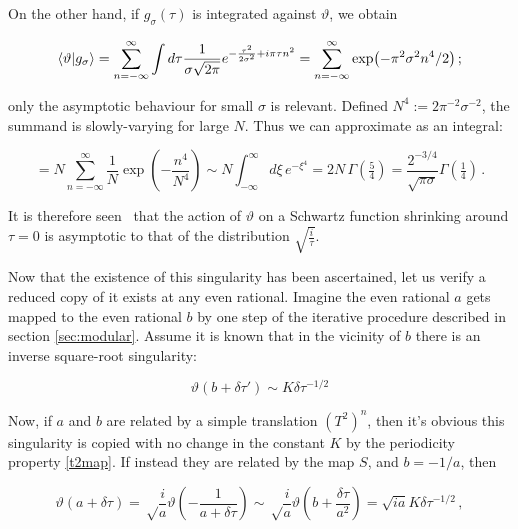 \documentclass{article}
\newcommand{\intR}{\int_{-\infty}^\infty}
\newcommand{\sumZ}{\sum_{n=-\infty}^{\infty}}
\begin{document}
On the other hand, if $g_\sigma(\tau)$ is integrated against $\vartheta$, we obtain

\begin{equation}
    \bra{\vartheta}\ket{g_\sigma} = \sumZ \int d\tau \frac{1}{\sigma \sqrt{2\pi}} e^{-\frac{\tau^2}{2\sigma^2} + i\pi\tau n^2}  = \sumZ \exp(-\pi^2 \sigma^2 n^4 / 2)\,; 
\end{equation}

only the asymptotic behaviour for small $\sigma$ is relevant. Defined $N^4 := 2 \pi^{-2} \sigma^{-2}$, the summand is slowly-varying for large $N$. Thus we can approximate as an integral:

\begin{equation}
    = N \sumZ \frac{1}{N} \exp(-\frac{n^4}{N^4}) \sim N \intR d\xi \, e^{-\xi^4} = 2 N \, \Gamma(\tfrac{5}{4}) = \frac{2^{-3/4}}{\sqrt{\pi\sigma}} \Gamma(\tfrac{1}{4})\,.
\end{equation}

It is therefore seen%
\ that the action of $\vartheta$ on a Schwartz function shrinking around $\tau=0$ is asymptotic to that of the distribution $\sqrt{\frac{i}{\tau}}$.

Now that the existence of this singularity has been ascertained, let us verify a reduced copy of it exists at any even rational. Imagine the even rational $a$ gets mapped to the even rational $b$ by one step of the iterative procedure described in section \ref{sec:modular}. Assume it is known that in the vicinity of $b$ there is an inverse square-root singularity:

\begin{equation}
    \vartheta(b + \delta\tau') \sim K \delta \tau^{-1/2}
\end{equation}

Now, if $a$ and $b$ are related by a simple translation $(T^2)^n$, then it's obvious this singularity is copied with no change in the constant $K$ by the periodicity property \eqref{t2map}. If instead they are related by the map $S$, and $b = -1/a$, then

\begin{equation}
    \vartheta(a + \delta\tau) = \sqrt\frac{i}{a} \vartheta\left(-\frac{1}{a+\delta\tau}\right) \sim \sqrt\frac{i}{a} \vartheta(b + \frac{\delta \tau}{a^2}) = \sqrt{ia} K \delta\tau^{-1/2}\,,
\end{equation}
\end{document}
